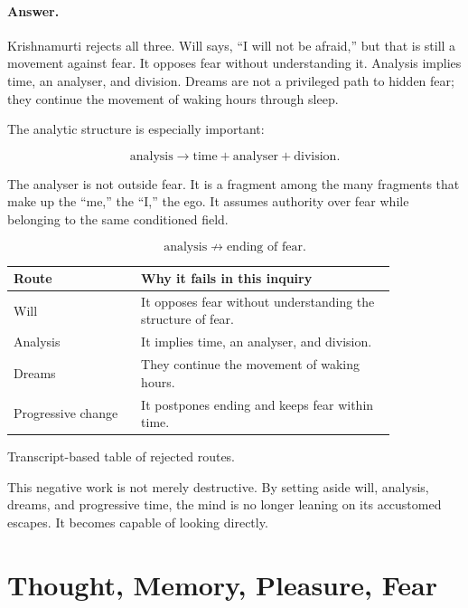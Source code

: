 \documentclass[11pt,oneside]{book}
\begin{document}
\paragraph{Answer.}
Krishnamurti rejects all three. Will says, ``I will not be afraid,'' but that is still a movement against fear. It opposes fear without understanding it. Analysis implies time, an analyser, and division. Dreams are not a privileged path to hidden fear; they continue the movement of waking hours through sleep.

The analytic structure is especially important:

\begin{equation}
\text{analysis}
\longrightarrow
\text{time}+\text{analyser}+\text{division}.
\end{equation}

The analyser is not outside fear. It is a fragment among the many fragments that make up the ``me,'' the ``I,'' the ego. It assumes authority over fear while belonging to the same conditioned field.

\begin{equation}
\text{analysis}
\not\longrightarrow
\text{ending of fear}.
\end{equation}

\begin{table}
\centering
\begin{tabular}{|p{0.28\linewidth}|p{0.56\linewidth}|}
\hline
\textbf{Route} & \textbf{Why it fails in this inquiry}\\
\hline
Will & It opposes fear without understanding the structure of fear.\\
\hline
Analysis & It implies time, an analyser, and division.\\
\hline
Dreams & They continue the movement of waking hours.\\
\hline
Progressive change & It postpones ending and keeps fear within time.\\
\hline
\end{tabular}

Transcript-based table of rejected routes.
\end{table}

This negative work is not merely destructive. By setting aside will, analysis, dreams, and progressive time, the mind is no longer leaning on its accustomed escapes. It becomes capable of looking directly.

\section{Thought, Memory, Pleasure, Fear}
\end{document}
